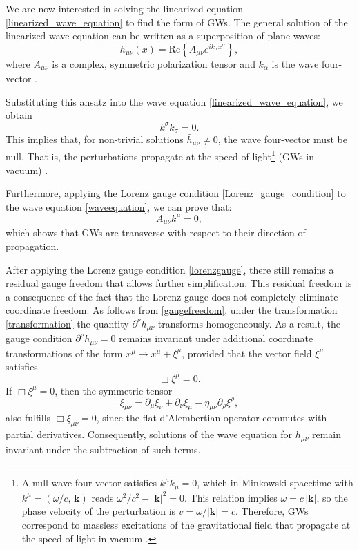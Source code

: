 We are now interested in solving the linearized equation \eqref{linearized_wave_equation} to find the form of GWs. The general solution of the linearized wave equation can be written as a superposition of plane waves:
\begin{equation}
    \bar{h}_{\mu\nu}(x) = \text{Re} \left\{ A_{\mu\nu} e^{i k_\alpha x^\alpha} \right\},
\label{waveequation}
\end{equation}
where $A_{\mu\nu}$ is a complex, symmetric polarization tensor and $k_\alpha$ is the wave four-vector \cite{llibreRamosSanchez2018}. 

Substituting this ansatz into the wave equation \eqref{linearized_wave_equation}, we obtain 
\begin{equation}
    k^\sigma k_\sigma = 0.
\end{equation}
This implies that, for non-trivial solutions $\bar{h}_{\mu\nu} \neq 0$, the wave four-vector must be null. That is, the perturbations propagate at the speed of light\footnote{A null wave four-vector satisfies $k^\mu k_\mu = 0$, which in Minkowski spacetime with $k^\mu = (\omega/c,\,\mathbf{k})$ reads $\omega^2/c^2 - |\mathbf{k}|^2 = 0$.
This relation implies $\omega = c\,|\mathbf{k}|$, so the phase velocity of the perturbation is $v = \omega / |\mathbf{k}| = c$. 
Therefore, GWs correspond to massless excitations of the gravitational field that propagate at the speed of light in vacuum \cite{llibretongGR}.} (GWs in vacuum) \cite{llibrecarroll2004lectures}.


Furthermore, applying the Lorenz gauge condition \eqref{Lorenz_gauge_condition} to the wave equation \eqref{waveequation}, we can prove that:
\begin{equation}
A_{\mu\nu} k^\mu = 0,
\end{equation}
which shows that GWs are transverse with respect to their direction of propagation.

After applying the Lorenz gauge condition \eqref{lorenzgauge}, there still remains a residual gauge freedom that allows further simplification. This residual freedom is a consequence of the fact that the Lorenz gauge does not completely eliminate coordinate freedom. As follows from \eqref{gaugefreedom}, under the transformation
\eqref{transformation} the quantity $\partial^\nu \bar{h}_{\mu\nu}$ transforms
homogeneously. As a result, the gauge condition
$\partial^\nu \bar{h}_{\mu\nu} = 0$ remains invariant under additional coordinate
transformations of the form $x^\mu \rightarrow x^\mu + \xi^\mu$, provided that
the vector field $\xi^\mu$ satisfies
\begin{equation}
\Box \xi^\mu = 0.
\end{equation}
If $\Box \xi^\mu = 0$, then the symmetric tensor
\begin{equation}
\xi_{\mu\nu} = \partial_\mu \xi_\nu + \partial_\nu \xi_\mu - \eta_{\mu\nu}
\partial_\rho \xi^\rho ,
\end{equation}
also fulfills $\Box \xi_{\mu\nu} = 0$, since the flat d’Alembertian operator
commutes with partial derivatives. Consequently, solutions of the wave equation
for $\bar{h}_{\mu\nu}$ remain invariant under the subtraction of such terms.

